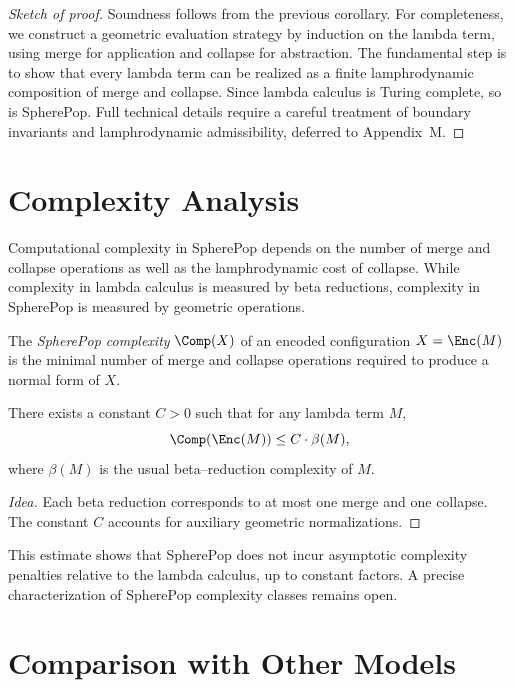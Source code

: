 \begin{proof}[Sketch of proof]
Soundness follows from the previous corollary. For completeness, we
construct a geometric evaluation strategy by induction on the lambda
term, using merge for application and collapse for abstraction. The
fundamental step is to show that every lambda term can be realized as a
finite lamphrodynamic composition of merge and collapse. Since lambda
calculus is Turing complete, so is SpherePop. Full technical details
require a careful treatment of boundary invariants and lamphrodynamic
admissibility, deferred to Appendix~M.
\end{proof}


\section{Complexity Analysis}

Computational complexity in SpherePop depends on the number of merge and
collapse operations as well as the lamphrodynamic cost of collapse.
While complexity in lambda calculus is measured by beta reductions,
complexity in SpherePop is measured by geometric operations.

\begin{definition}
The \emph{SpherePop complexity} $\Comp(X)$ of an encoded configuration
$X=\Enc(M)$ is the minimal number of merge and collapse operations
required to produce a normal form of $X$.
\end{definition}

\begin{proposition}
There exists a constant $C>0$ such that for any lambda term $M$,
\[
  \Comp(\Enc(M)) \le C \cdot \beta(M),
\]
where $\beta(M)$ is the usual beta--reduction complexity of $M$.
\end{proposition}

\begin{proof}[Idea]
Each beta reduction corresponds to at most one merge and one collapse.
The constant $C$ accounts for auxiliary geometric normalizations.
\end{proof}

\begin{remark}
This estimate shows that SpherePop does not incur asymptotic complexity
penalties relative to the lambda calculus, up to constant factors. A
precise characterization of SpherePop complexity classes remains open.
\end{remark}


\section{Comparison with Other Models}

